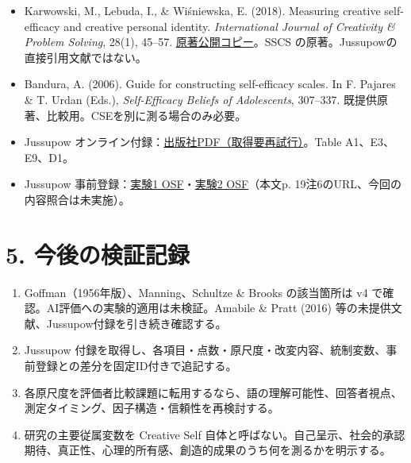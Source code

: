 \documentclass[
  11pt,
  a4paper,
]{article}
\providecommand{\tightlist}{%
  \setlength{\itemsep}{0pt}\setlength{\parskip}{0pt}}
\begin{document}
\begin{itemize}
\tightlist
\item
  Karwowski, M., Lebuda, I., \& Wiśniewska, E. (2018). Measuring
  creative self-efficacy and creative personal identity.
  \emph{International Journal of Creativity \& Problem Solving}, 28(1),
  45--57.
  \href{https://www.researchgate.net/publication/325070288_Measuring_Creative_Self-efficacy_and_Creative_Personal_Identity}{原著公開コピー}。SSCS
  の原著。Jussupowの直接引用文献ではない。
\item
  Bandura, A. (2006). Guide for constructing self-efficacy scales. In F.
  Pajares \& T. Urdan (Eds.), \emph{Self-Efficacy Beliefs of
  Adolescents}, 307--337.
  既提供原著、比較用。CSEを別に測る場合のみ必要。
\item
  Jussupow
  オンライン付録：\href{https://pubsonline.informs.org/doi/suppl/10.1287/isre.2024.0951/suppl_file/isre.2024.0951.sm1.pdf}{出版社PDF（取得要再試行）}。Table
  A1、E3、E9、D1。
\item
  Jussupow
  事前登録：\href{https://osf.io/sp7qh/?view_only=a46b637f786e493ca968c4b34dc490f8}{実験1
  OSF}・\href{https://osf.io/eaujy?view_only=75f050b712e240ca892df32490772989}{実験2
  OSF}（本文p. 19注6のURL、今回の内容照合は未実施）。
\end{itemize}

\section{5.
今後の検証記録}\label{ux4ecaux5f8cux306eux691cux8a3cux8a18ux9332}

\begin{enumerate}
\def\labelenumi{\arabic{enumi}.}
\tightlist
\item
  Goffman（1956年版）、Manning、Schultze \& Brooks の該当箇所は v4
  で確認。AI評価への実験的適用は未検証。Amabile \& Pratt (2016)
  等の未提供文献、Jussupow付録を引き続き確認する。
\item
  Jussupow
  付録を取得し、各項目・点数・原尺度・改変内容、統制変数、事前登録との差分を固定ID付きで追記する。
\item
  各原尺度を評価者比較課題に転用するなら、語の理解可能性、回答者視点、測定タイミング、因子構造・信頼性を再検討する。
\item
  研究の主要従属変数を Creative Self
  自体と呼ばない。自己呈示、社会的承認期待、真正性、心理的所有感、創造的成果のうち何を測るかを明示する。
\end{enumerate}
\end{document}
